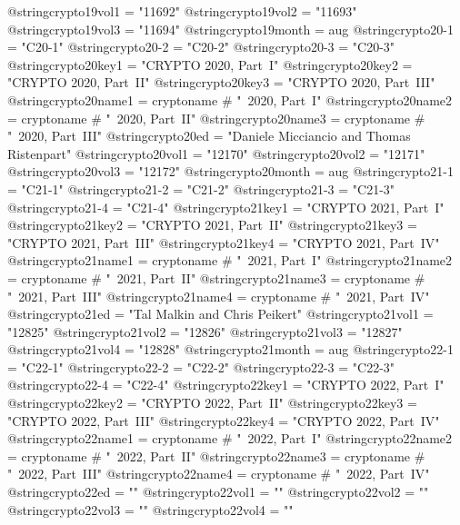 @string{crypto19vol1 =          "11692"}
@string{crypto19vol2 =          "11693"}
@string{crypto19vol3 =          "11694"}
@string{crypto19month =         aug}
@string{crypto20-1 =            "C20-1"}
@string{crypto20-2 =            "C20-2"}
@string{crypto20-3 =            "C20-3"}
@string{crypto20key1 =          "CRYPTO 2020, Part~I"}
@string{crypto20key2 =          "CRYPTO 2020, Part~II"}
@string{crypto20key3 =          "CRYPTO 2020, Part~III"}
@string{crypto20name1 =         cryptoname # "~2020, Part~I"}
@string{crypto20name2 =         cryptoname # "~2020, Part~II"}
@string{crypto20name3 =         cryptoname # "~2020, Part~III"}
@string{crypto20ed =            "Daniele Micciancio and Thomas Ristenpart"}
@string{crypto20vol1 =          "12170"}
@string{crypto20vol2 =          "12171"}
@string{crypto20vol3 =          "12172"}
@string{crypto20month =         aug}
@string{crypto21-1 =            "C21-1"}
@string{crypto21-2 =            "C21-2"}
@string{crypto21-3 =            "C21-3"}
@string{crypto21-4 =            "C21-4"}
@string{crypto21key1 =          "CRYPTO 2021, Part~I"}
@string{crypto21key2 =          "CRYPTO 2021, Part~II"}
@string{crypto21key3 =          "CRYPTO 2021, Part~III"}
@string{crypto21key4 =          "CRYPTO 2021, Part~IV"}
@string{crypto21name1 =         cryptoname # "~2021, Part~I"}
@string{crypto21name2 =         cryptoname # "~2021, Part~II"}
@string{crypto21name3 =         cryptoname # "~2021, Part~III"}
@string{crypto21name4 =         cryptoname # "~2021, Part~IV"}
@string{crypto21ed =            "Tal Malkin and Chris Peikert"}
@string{crypto21vol1 =          "12825"}
@string{crypto21vol2 =          "12826"}
@string{crypto21vol3 =          "12827"}
@string{crypto21vol4 =          "12828"}
@string{crypto21month =         aug}
@string{crypto22-1 =            "C22-1"}
@string{crypto22-2 =            "C22-2"}
@string{crypto22-3 =            "C22-3"}
@string{crypto22-4 =            "C22-4"}
@string{crypto22key1 =          "CRYPTO 2022, Part~I"}
@string{crypto22key2 =          "CRYPTO 2022, Part~II"}
@string{crypto22key3 =          "CRYPTO 2022, Part~III"}
@string{crypto22key4 =          "CRYPTO 2022, Part~IV"}
@string{crypto22name1 =         cryptoname # "~2022, Part~I"}
@string{crypto22name2 =         cryptoname # "~2022, Part~II"}
@string{crypto22name3 =         cryptoname # "~2022, Part~III"}
@string{crypto22name4 =         cryptoname # "~2022, Part~IV"}
@string{crypto22ed =            ""}
@string{crypto22vol1 =          ""}
@string{crypto22vol2 =          ""}
@string{crypto22vol3 =          ""}
@string{crypto22vol4 =          ""}
